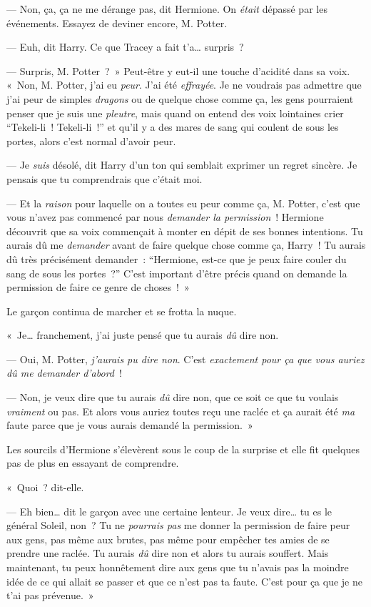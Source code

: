 --- Non, ça, ça ne me dérange pas, dit Hermione. On \emph{était} dépassé par les événements. Essayez de deviner encore, M. Potter.

--- Euh, dit Harry. Ce que Tracey a fait t'a… surpris~?

--- Surpris, M. Potter~?~» Peut-être y eut-il une touche d'acidité dans sa voix. «~Non, M. Potter, j'ai eu \emph{peur}. J'ai été \emph{effrayée}. Je ne voudrais pas admettre que j'ai peur de simples \emph{dragons} ou de quelque chose comme ça, les gens pourraient penser que je suis une \emph{pleutre}, mais quand on entend des voix lointaines crier “Tekeli-li~! Tekeli-li~!” et qu'il y a des mares de sang qui coulent de sous les portes, alors c'est normal d'avoir peur.

--- Je \emph{suis} désolé, dit Harry d'un ton qui semblait exprimer un regret sincère. Je pensais que tu comprendrais que c'était moi.

--- Et la \emph{raison} pour laquelle on a toutes eu peur comme ça, M. Potter, c'est que vous n'avez pas commencé par nous \emph{demander la permission}~! Hermione découvrit que sa voix commençait à monter en dépit de ses bonnes intentions. Tu aurais dû me \emph{demander} avant de faire quelque chose comme ça, Harry~! Tu aurais dû très précisément demander~: “Hermione, est-ce que je peux faire couler du sang de sous les portes~?” C'est important d'être précis quand on demande la permission de faire ce genre de choses~!~»

Le garçon continua de marcher et se frotta la nuque.

«~Je… franchement, j'ai juste pensé que tu aurais \emph{dû} dire non.

--- Oui, M. Potter, \emph{j'aurais pu dire non}. C'est \emph{exactement pour ça que vous auriez dû me demander d'abord}~!

--- Non, je veux dire que tu aurais \emph{dû} dire non, que ce soit ce que tu voulais \emph{vraiment} ou pas. Et alors vous auriez toutes reçu une raclée et ça aurait été \emph{ma} faute parce que je vous aurais demandé la permission.~»

Les sourcils d'Hermione s'élevèrent sous le coup de la surprise et elle fit quelques pas de plus en essayant de comprendre.

«~Quoi~? dit-elle.

--- Eh bien… dit le garçon avec une certaine lenteur. Je veux dire… tu es le général Soleil, non~? Tu ne \emph{pourrais pas} me donner la permission de faire peur aux gens, pas même aux brutes, pas même pour empêcher tes amies de se prendre une raclée. Tu aurais \emph{dû} dire non et alors tu aurais souffert. Mais maintenant, tu peux honnêtement dire aux gens que tu n'avais pas la moindre idée de ce qui allait se passer et que ce n'est pas ta faute. C'est pour ça que je ne t'ai pas prévenue.~»

